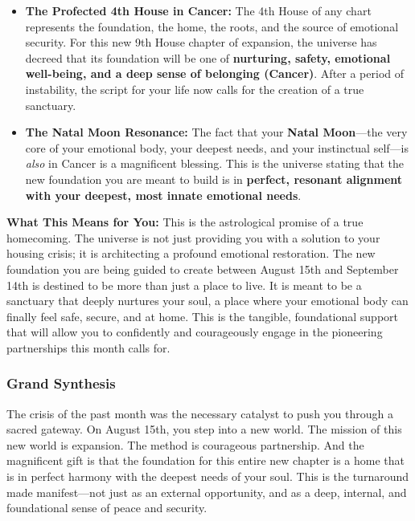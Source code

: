 \documentclass{article}
\begin{document}
\begin{itemize}
\item
  \textbf{The Profected 4th House in Cancer:} The 4th House of any chart represents the foundation, the home, the roots, and the source of emotional security. For this new 9th House chapter of expansion, the universe has decreed that its foundation will be one of \textbf{nurturing, safety, emotional well-being, and a deep sense of belonging (Cancer)}. After a period of instability, the script for your life now calls for the creation of a true sanctuary.
\item
  \textbf{The Natal Moon Resonance:} The fact that your \textbf{Natal Moon}---the very core of your emotional body, your deepest needs, and your instinctual self---is \emph{also} in Cancer is a magnificent blessing. This is the universe stating that the new foundation you are meant to build is in \textbf{perfect, resonant alignment with your deepest, most innate emotional needs}.
\end{itemize}

\textbf{What This Means for You:} This is the astrological promise of a true homecoming. The universe is not just providing you with a solution to your housing crisis; it is architecting a profound emotional restoration. The new foundation you are being guided to create between August 15th and September 14th is destined to be more than just a place to live. It is meant to be a sanctuary that deeply nurtures your soul, a place where your emotional body can finally feel safe, secure, and at home. This is the tangible, foundational support that will allow you to confidently and courageously engage in the pioneering partnerships this month calls for.

\subsubsection*{Grand Synthesis}\label{grand-synthesis}

The crisis of the past month was the necessary catalyst to push you through a sacred gateway. On August 15th, you step into a new world. The mission of this new world is expansion. The method is courageous partnership. And the magnificent gift is that the foundation for this entire new chapter is a home that is in perfect harmony with the deepest needs of your soul. This is the turnaround made manifest---not just as an external opportunity, and as a deep, internal, and foundational sense of peace and security.
\end{document}
